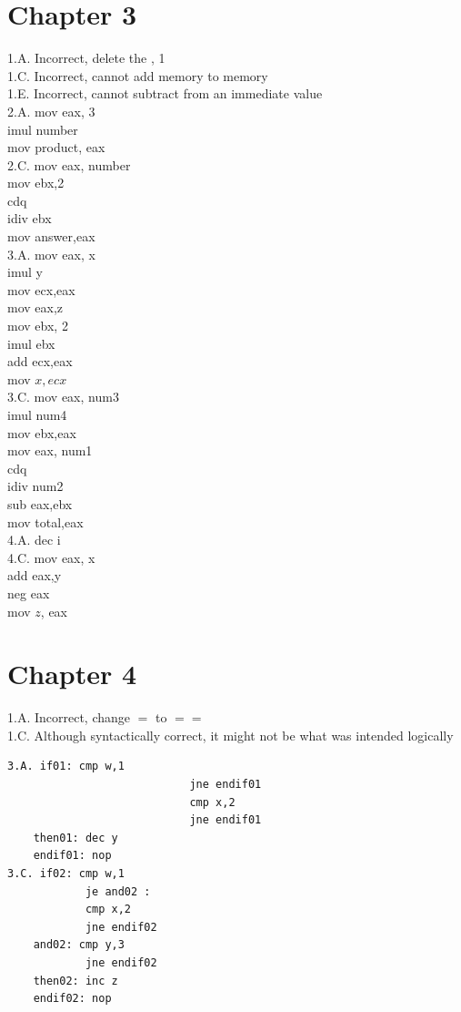 \documentclass[10pt]{book}
\begin{document}
\section{Chapter 3}
1.A. Incorrect, delete the , 1\\
1.C. Incorrect, cannot add memory to memory\\
1.E. Incorrect, cannot subtract from an immediate value\\
2.A. mov eax, 3\\
imul number\\
mov product, eax\\
2.C. mov eax, number\\
mov ebx,2\\
cdq\\
idiv ebx\\
mov answer,eax\\
3.A. mov eax, x\\
imul y\\
mov ecx,eax\\
mov eax,z\\
mov ebx, 2\\
imul ebx\\
add ecx,eax\\
mov $x, e c x$\\
3.C. mov eax, num3\\
imul num4\\
mov ebx,eax\\
mov eax, num1\\
cdq\\
idiv num2\\
sub eax,ebx\\
mov total,eax\\
4.A. dec i\\
4.C. mov eax, x\\
add eax,y\\
neg eax\\
mov $z$, eax

\section{Chapter 4}
1.A. Incorrect, change $=$ to $==$\\
1.C. Although syntactically correct, it might not be what was intended logically
\begin{verbatim}
3.A. if01: cmp w,1
                            jne endif01
                            cmp x,2
                            jne endif01
    then01: dec y
    endif01: nop
3.C. if02: cmp w,1
            je and02 :
            cmp x,2
            jne endif02
    and02: cmp y,3
            jne endif02
    then02: inc z
    endif02: nop
\end{verbatim}
\end{document}
